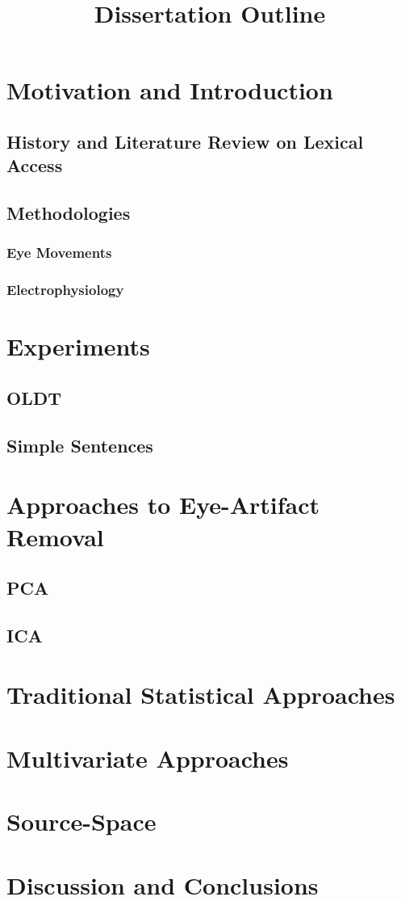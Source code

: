 \documentclass[english]{article}
\begin{document}
\title{Dissertation Outline}

\maketitle

\section{Motivation and Introduction}


\subsection{History and Literature Review on Lexical Access}

\subsection{Methodologies}

\subsubsection{Eye Movements}

\subsubsection{Electrophysiology}


\section{Experiments}

\subsection{OLDT}

\subsection{Simple Sentences}


\section{Approaches to Eye-Artifact Removal}
\subsection{PCA}
\subsection{ICA}


\section{Traditional Statistical Approaches}


\section{Multivariate Approaches}


\section{Source-Space}


\section{Discussion and Conclusions}
\end{document}
